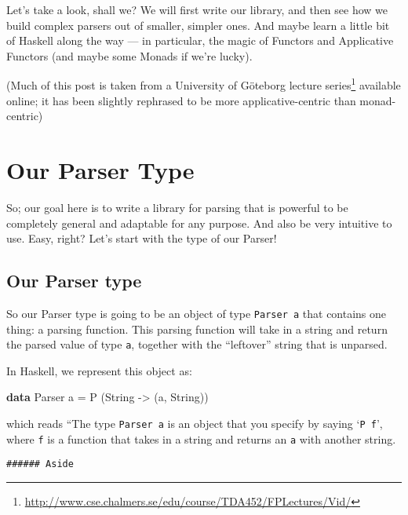 \documentclass[]{article}
\newenvironment{Shaded}{}{}
\newcommand{\KeywordTok}[1]{\textcolor[rgb]{0.00,0.44,0.13}{\textbf{{#1}}}}
\newcommand{\DataTypeTok}[1]{\textcolor[rgb]{0.56,0.13,0.00}{{#1}}}
\newcommand{\OtherTok}[1]{\textcolor[rgb]{0.00,0.44,0.13}{{#1}}}
\newcommand{\FunctionTok}[1]{\textcolor[rgb]{0.02,0.16,0.49}{{#1}}}
\newcommand{\NormalTok}[1]{{#1}}
\renewcommand{\href}[2]{#2\footnote{\url{#1}}}
\begin{document}
Let's take a look, shall we? We will first write our library, and then
see how we build complex parsers out of smaller, simpler ones. And maybe
learn a little bit of Haskell along the way --- in particular, the magic
of Functors and Applicative Functors (and maybe some Monads if we're
lucky).

(Much of this post is taken from a University of Göteborg
\href{http://www.cse.chalmers.se/edu/course/TDA452/FPLectures/Vid/}{lecture
series} available online; it has been slightly rephrased to be more
applicative-centric than monad-centric)

\section{Our Parser Type}\label{our-parser-type}

So; our goal here is to write a library for parsing that is powerful to
be completely general and adaptable for any purpose. And also be very
intuitive to use. Easy, right? Let's start with the type of our Parser!

\subsection{Our Parser type}\label{our-parser-type-1}

So our Parser type is going to be an object of type \texttt{Parser\ a}
that contains one thing: a parsing function. This parsing function will
take in a string and return the parsed value of type \texttt{a},
together with the ``leftover'' string that is unparsed.

In Haskell, we represent this object as:

\begin{Shaded}
\begin{Highlighting}[]
\KeywordTok{data} \DataTypeTok{Parser} \NormalTok{a }\FunctionTok{=} \DataTypeTok{P} \NormalTok{(}\DataTypeTok{String} \OtherTok{->} \NormalTok{(a, }\DataTypeTok{String}\NormalTok{))}
\end{Highlighting}
\end{Shaded}

which reads ``The type \texttt{Parser\ a} is an object that you specify
by saying `\texttt{P\ f}', where \texttt{f} is a function that takes in
a string and returns an \texttt{a} with another string.

\begin{verbatim}
###### Aside
\end{verbatim}
\end{document}
